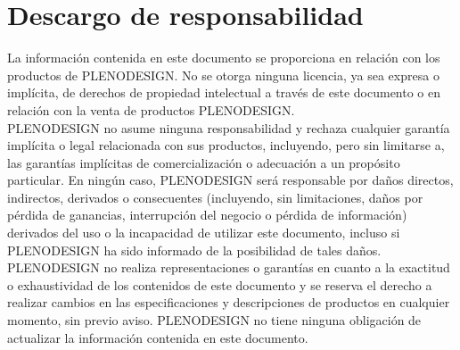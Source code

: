 \chapter{Descargo de responsabilidad}
\label{chp:descargo}
La información contenida en este documento se proporciona en relación con los productos de PLENODESIGN. No se otorga ninguna licencia, ya sea expresa o implícita, de derechos de propiedad intelectual a través de este documento o en relación con la venta de productos PLENODESIGN.\\

PLENODESIGN no asume ninguna responsabilidad y rechaza cualquier garantía implícita o legal relacionada con sus productos, incluyendo, pero sin limitarse a, las garantías implícitas de comercialización o adecuación a un propósito particular. En ningún caso, PLENODESIGN será responsable por daños directos, indirectos, derivados o consecuentes (incluyendo, sin limitaciones, daños por pérdida de ganancias, interrupción del negocio o pérdida de información) derivados del uso o la incapacidad de utilizar este documento, incluso si PLENODESIGN ha sido informado de la posibilidad de tales daños.\\

PLENODESIGN no realiza representaciones o garantías en cuanto a la exactitud o exhaustividad de los contenidos de este documento y se reserva el derecho a realizar cambios en las especificaciones y descripciones de productos en cualquier momento, sin previo aviso. PLENODESIGN no tiene ninguna obligación de actualizar la información contenida en este documento.
